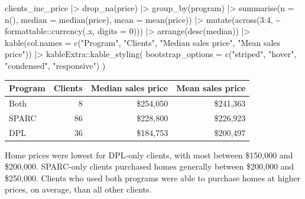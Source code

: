 \documentclass[
  letterpaper,
  DIV=11,
  numbers=noendperiod]{scrartcl}
\newenvironment{Shaded}{\begin{snugshade}}{\end{snugshade}}
\newcommand{\AttributeTok}[1]{\textcolor[rgb]{0.40,0.45,0.13}{#1}}
\newcommand{\DecValTok}[1]{\textcolor[rgb]{0.68,0.00,0.00}{#1}}
\newcommand{\FunctionTok}[1]{\textcolor[rgb]{0.28,0.35,0.67}{#1}}
\newcommand{\NormalTok}[1]{\textcolor[rgb]{0.00,0.23,0.31}{#1}}
\newcommand{\SpecialCharTok}[1]{\textcolor[rgb]{0.37,0.37,0.37}{#1}}
\newcommand{\StringTok}[1]{\textcolor[rgb]{0.13,0.47,0.30}{#1}}
\begin{document}
\begin{Shaded}
\begin{Highlighting}[]
\NormalTok{clients\_inc\_price }\SpecialCharTok{|\textgreater{}} 
  \FunctionTok{drop\_na}\NormalTok{(price) }\SpecialCharTok{|\textgreater{}} 
  \FunctionTok{group\_by}\NormalTok{(program) }\SpecialCharTok{|\textgreater{}} 
  \FunctionTok{summarise}\NormalTok{(}\AttributeTok{n =} \FunctionTok{n}\NormalTok{(),}
            \AttributeTok{median =} \FunctionTok{median}\NormalTok{(price),}
            \AttributeTok{mean =} \FunctionTok{mean}\NormalTok{(price)) }\SpecialCharTok{|\textgreater{}} 
  \FunctionTok{mutate}\NormalTok{(}\FunctionTok{across}\NormalTok{(}\DecValTok{3}\SpecialCharTok{:}\DecValTok{4}\NormalTok{, }\SpecialCharTok{\textasciitilde{}}\NormalTok{ formattable}\SpecialCharTok{::}\FunctionTok{currency}\NormalTok{(.x, }\AttributeTok{digits =} \DecValTok{0}\NormalTok{))) }\SpecialCharTok{|\textgreater{}} 
  \FunctionTok{arrange}\NormalTok{(}\FunctionTok{desc}\NormalTok{(median)) }\SpecialCharTok{|\textgreater{}} 
  \FunctionTok{kable}\NormalTok{(}\AttributeTok{col.names =} \FunctionTok{c}\NormalTok{(}\StringTok{"Program"}\NormalTok{, }\StringTok{"Clients"}\NormalTok{, }\StringTok{"Median sales price"}\NormalTok{, }\StringTok{"Mean sales price"}\NormalTok{)) }\SpecialCharTok{|\textgreater{}} 
\NormalTok{  kableExtra}\SpecialCharTok{::}\FunctionTok{kable\_styling}\NormalTok{(}
    \AttributeTok{bootstrap\_options =} \FunctionTok{c}\NormalTok{(}\StringTok{"striped"}\NormalTok{, }\StringTok{"hover"}\NormalTok{, }\StringTok{"condensed"}\NormalTok{, }\StringTok{"responsive"}\NormalTok{)}
\NormalTok{  )}
\end{Highlighting}
\end{Shaded}

\begin{table}
\centering
\begin{tabular}{l|r|r|r}
\hline
Program & Clients & Median sales price & Mean sales price\\
\hline
Both & 8 & \$254,050 & \$241,363\\
\hline
SPARC & 86 & \$228,800 & \$226,923\\
\hline
DPL & 36 & \$184,753 & \$200,497\\
\hline
\end{tabular}
\end{table}

Home prices were lowest for DPL-only clients, with most between
\$150,000 and \$200,000. SPARC-only clients purchased homes generally
between \$200,000 and \$250,000. Clients who used both programs were
able to purchase homes at higher prices, on average, than all other
clients.
\end{document}
